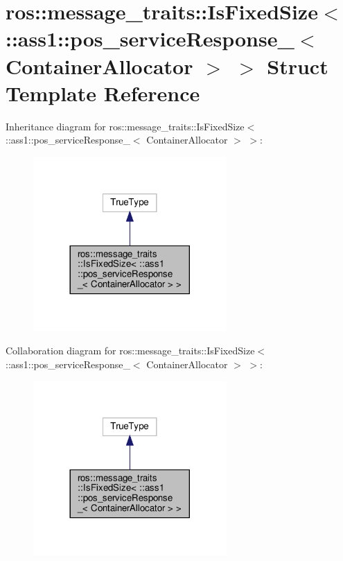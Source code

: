 \hypertarget{structros_1_1message__traits_1_1IsFixedSize_3_01_1_1ass1_1_1pos__serviceResponse___3_01ContainerAllocator_01_4_01_4}{}\section{ros\+:\+:message\+\_\+traits\+:\+:Is\+Fixed\+Size$<$ \+:\+:ass1\+:\+:pos\+\_\+service\+Response\+\_\+$<$ Container\+Allocator $>$ $>$ Struct Template Reference}
\label{structros_1_1message__traits_1_1IsFixedSize_3_01_1_1ass1_1_1pos__serviceResponse___3_01ContainerAllocator_01_4_01_4}


Inheritance diagram for ros\+:\+:message\+\_\+traits\+:\+:Is\+Fixed\+Size$<$ \+:\+:ass1\+:\+:pos\+\_\+service\+Response\+\_\+$<$ Container\+Allocator $>$ $>$\+:
\nopagebreak
\begin{figure}[H]
\begin{center}
\leavevmode
\includegraphics[width=209pt]{structros_1_1message__traits_1_1IsFixedSize_3_01_1_1ass1_1_1pos__serviceResponse___3_01Container1a86f07b5998e103a7bcee2d5da1fb87}
\end{center}
\end{figure}


Collaboration diagram for ros\+:\+:message\+\_\+traits\+:\+:Is\+Fixed\+Size$<$ \+:\+:ass1\+:\+:pos\+\_\+service\+Response\+\_\+$<$ Container\+Allocator $>$ $>$\+:
\nopagebreak
\begin{figure}[H]
\begin{center}
\leavevmode
\includegraphics[width=209pt]{structros_1_1message__traits_1_1IsFixedSize_3_01_1_1ass1_1_1pos__serviceResponse___3_01Container8d49bff9bcda665ffb2287b5d2b4a53c}
\end{center}
\end{figure}


